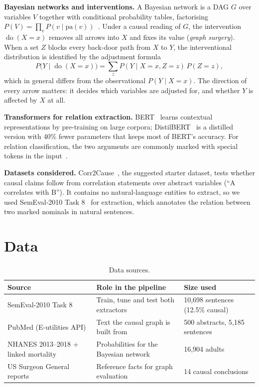 \documentclass[11pt,a4paper]{article}
\newcommand{\doop}{\operatorname{do}}
\begin{document}
\textbf{Bayesian networks and interventions.} A Bayesian network is a DAG $G$ over variables $V$ together with conditional
probability tables, factorising $P(V)=\prod_{v} P(v \mid \mathrm{pa}(v))$~\citep{pearl1988}. Under a causal reading of $G$, the
intervention $\doop(X{=}x)$ removes all arrows into $X$ and fixes its value (\emph{graph surgery}). When a set $Z$ blocks every
back-door path from $X$ to $Y$, the interventional distribution is identified by the adjustment formula~\citep{pearl2009}
\begin{equation}
  P\big(Y \mid \doop(X{=}x)\big) = \sum_{z} P(Y \mid X{=}x, Z{=}z)\, P(Z{=}z),
  \label{eq:backdoor}
\end{equation}
which in general differs from the observational $P(Y \mid X{=}x)$. The direction of every arrow matters: it decides which
variables are adjusted for, and whether $Y$ is affected by $X$ at all.

\textbf{Transformers for relation extraction.} BERT~\citep{devlin2019} learns contextual representations by pre-training on large
corpora; DistilBERT~\citep{sanh2019} is a distilled version with 40\% fewer parameters that keeps most of BERT's accuracy. For
relation classification, the two arguments are commonly marked with special tokens in the input~\citep{baldinisoares2019}.

\textbf{Datasets considered.} Corr2Cause~\citep{jin2024corr2cause}, the suggested starter dataset, tests whether causal claims follow
from correlation statements over abstract variables (``A correlates with B''). It contains no natural-language entities to extract, so
we used SemEval-2010 Task 8~\citep{hendrickx2010} for extraction, which annotates the relation between two marked nominals in natural
sentences.

\section{Data}

\begin{table}[H]
\centering\small
\begin{tabularx}{\linewidth}{@{}lYl@{}}
\toprule
Source & Role in the pipeline & Size used \\
\midrule
SemEval-2010 Task 8~\citep{hendrickx2010} & Train, tune and test both extractors & 10{,}698 sentences (12.5\% causal) \\
PubMed (E-utilities API) & Text the causal graph is built from & 500 abstracts, 5{,}185 sentences \\
NHANES 2013--2018 + linked mortality~\citep{nhanes,nchsmort} & Probabilities for the Bayesian network & 16{,}904 adults \\
US Surgeon General reports~\citep{sgr2014,sgr2010} & Reference facts for graph evaluation & 14 causal conclusions \\
\bottomrule
\end{tabularx}
\caption{Data sources.}
\label{tab:data}
\end{table}
\end{document}
